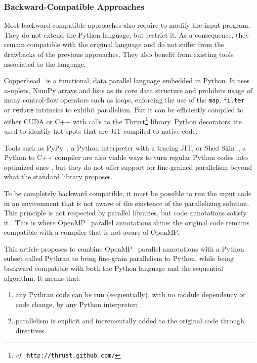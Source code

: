 \documentclass{llncs}
\begin{document}
\subsubsection{Backward-Compatible Approaches}

Most backward-compatible approaches also require to modify the input program.
They do not extend the Python language, but restrict it. As a consequence, they
remain compatible with the original language and do not suffer from the
drawbacks of the previous approaches. They also benefit from existing tools
associated to the language.

Copperhead~\cite{copperhead2011} is a functional, data parallel language
embedded in Python. It uses $n$-uplets, NumPy arrays and lists as its core data
structure and prohibits usage of many control-flow operators such as loops,
enforcing the use of the \texttt{map}, \texttt{filter} or \texttt{reduce}
intrinsics to exhibit parallelism. But it can be efficiently compiled to either
CUDA or C++ with calls to the Thrust\footnote{\emph{cf}.\
\texttt{http://thrust.github.com/}} library. Python decorators are used to
identify hot-spots that are JIT-compiled to native code.

Tools such as PyPy~\cite{pypy2009}, a Python interpreter with a tracing JIT, or
Shed Skin~\cite{shedskin2006}, a Python to C++ compiler are also viable ways to
turn regular Python codes into optimized ones , but they do not offer support for
fine-grained parallelism beyond what the standard library proposes.

To be completely backward compatible, it must be possible to run the input code
in an environment that is not aware of the existence of the parallelizing
solution\marginpar{First sentence is unclear to me.}. This principle is not respected by parallel libraries, but code
annotations satisfy it . This is where OpenMP~\cite{openmp3.1} parallel
annotations shine: the original code remains compatible with a compiler that is
not aware of OpenMP.\marginpar{This is wrong.}

This article proposes to combine OpenMP~\cite{openmp3.1} parallel annotations
with a Python subset called Pythran to bring fine-grain parallelism to Python,
while being backward compatible with both the Python language and the
sequential algorithm. It means that:
%
\begin{enumerate}
    \item any Pythran code can be run (sequentially), with no module dependency
        or code change, by any Python interpreter;
    \item parallelism is explicit and incrementally added to the original code
        through directives.
\end{enumerate}
\end{document}

